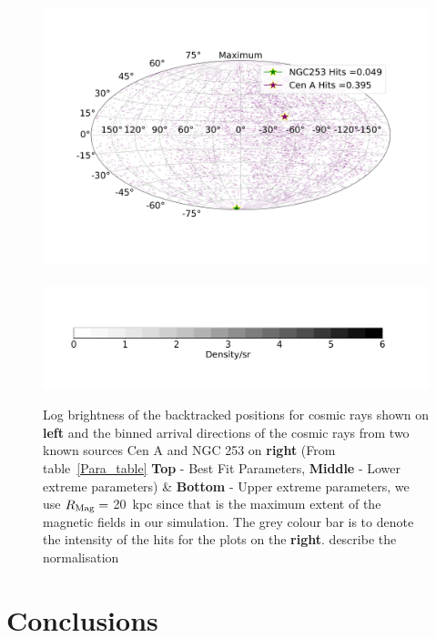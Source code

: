 \documentclass[usenatbib]{mnras}
\newcommand{\Vasu}[1]{{\color{purple}#1}}
\begin{document}
\begin{figure}
\includegraphics[width=0.49\linewidth]{Images/Bins_180_UB_N2_CenA_NGC253_Str_Tur_TM_40_EeV.png}\
\hspace*{+9cm}                                      \includegraphics[width=0.50\linewidth]{Images/Colorbar.png}
\caption{Log brightness of the backtracked positions for cosmic rays shown on \textbf{left} and the binned arrival directions of the cosmic rays from two known sources Cen A and NGC 253 on \textbf{right} (From table~\ref{Para_table} \textbf{Top} - Best Fit Parameters, {\textbf{Middle} - Lower extreme parameters)} \& {\textbf{Bottom} - Upper extreme parameters, we use $R_{\rm Mag} = $ 20~kpc since that is the maximum extent of the magnetic fields in our simulation. The grey colour bar is to denote the intensity of the hits for the plots on the \textbf{right}. }
\Vasu{describe the normalisation}}
\label{fig:AD_Plots}
\end{figure}

\section{Conclusions}
\label{Conclusions}
\end{document}
